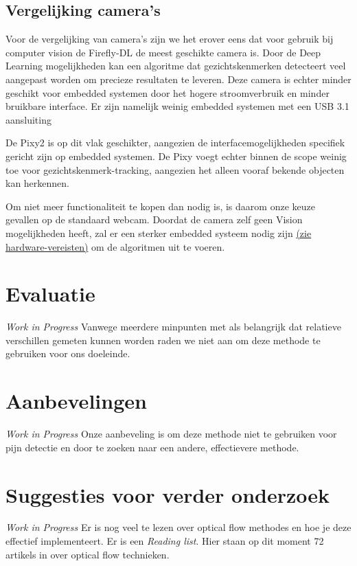 \documentclass[11pt]{article}
\begin{document}
    \subsection{Vergelijking camera's}
    Voor de vergelijking van camera's zijn we het erover eens dat voor gebruik bij computer vision de Firefly-DL de meest geschikte camera is.
    Door de Deep Learning mogelijkheden kan een algoritme dat gezichtskenmerken detecteert veel aangepast worden om precieze resultaten te leveren.
    Deze camera is echter minder geschikt voor embedded systemen door het hogere stroomverbruik en minder bruikbare interface. 
    Er zijn namelijk weinig embedded systemen met een USB 3.1 aansluiting\footnotemark[3]


    De Pixy2 is op dit vlak geschikter, aangezien de interfacemogelijkheden specifiek gericht zijn op embedded systemen.
    De Pixy voegt echter binnen de scope weinig toe voor gezichtskenmerk-tracking, aangezien het alleen vooraf bekende objecten kan herkennen.

    Om niet meer functionaliteit te kopen dan nodig is, is daarom onze keuze gevallen op de standaard webcam. 
    Doordat de camera zelf geen Vision mogelijkheden heeft, zal er een sterker embedded systeem nodig zijn \hyperref[meth1-hardware]{(zie hardware-vereisten)} om de algoritmen uit te voeren.
    

    \section{Evaluatie}\label{sec:evaluatie2}
    \emph{Work in Progress}
    Vanwege meerdere minpunten met als belangrijk dat relatieve verschillen gemeten kunnen worden raden we niet aan om deze methode te gebruiken voor ons doeleinde.


    \section{Aanbevelingen}\label{sec:aanbevelingen2}
    \emph{Work in Progress}
    Onze aanbeveling is om deze methode niet te gebruiken voor pijn detectie en door te zoeken naar een andere, effectievere methode.

    

    \section{Suggesties voor verder onderzoek}\label{sec:suggesties-voor-verder-onderzoek2}
    \emph{Work in Progress}
    Er is nog veel te lezen over optical flow methodes en hoe je deze effectief implementeert.
    Er is een \emph{\citet{Readinglist} Reading list}.
    Hier staan op dit moment 72 artikels in over optical flow technieken.
\end{document}
